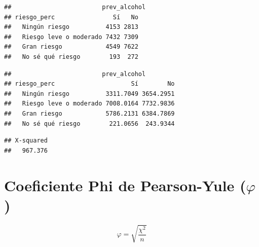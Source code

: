 \documentclass[spanish,]{book}
\newenvironment{Shaded}{\begin{snugshade}}{\end{snugshade}}
\newcommand{\KeywordTok}[1]{\textcolor[rgb]{0.13,0.29,0.53}{\textbf{#1}}}
\newcommand{\DataTypeTok}[1]{\textcolor[rgb]{0.13,0.29,0.53}{#1}}
\newcommand{\StringTok}[1]{\textcolor[rgb]{0.31,0.60,0.02}{#1}}
\newcommand{\OperatorTok}[1]{\textcolor[rgb]{0.81,0.36,0.00}{\textbf{#1}}}
\newcommand{\NormalTok}[1]{#1}
\begin{document}
\begin{verbatim}
##                         prev_alcohol
## riesgo_perc                Sí   No
##   Ningún riesgo          4153 2813
##   Riesgo leve o moderado 7432 7309
##   Gran riesgo            4549 7622
##   No sé qué riesgo        193  272
\end{verbatim}

\begin{Shaded}
\end{Shaded}

\begin{verbatim}
##                         prev_alcohol
## riesgo_perc                     Sí        No
##   Ningún riesgo          3311.7049 3654.2951
##   Riesgo leve o moderado 7008.0164 7732.9836
##   Gran riesgo            5786.2131 6384.7869
##   No sé qué riesgo        221.0656  243.9344
\end{verbatim}

\begin{Shaded}
\end{Shaded}

\begin{verbatim}
## X-squared 
##   967.376
\end{verbatim}

\section{\texorpdfstring{Coeficiente Phi de Pearson-Yule
(\(\varphi\))}{Coeficiente Phi de Pearson-Yule (\textbackslash{}varphi)}}\label{coeficiente-phi-de-pearson-yule-varphi}

\[
\varphi = \sqrt{\frac{\chi^2}{n}}
\]

\begin{Shaded}
\end{Shaded}
\end{document}
